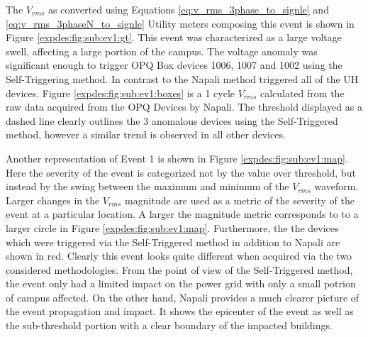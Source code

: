 The $V_{rms}$ as converted using Equations \ref{eq:v_rms_3phase_to_signle} and \ref{eq:v_rms_3phaseN_to_signle} Utility meters composing this event is shown in Figure \ref{expdes:fig:sub:ev1:gt}.
This event was characterized as a large voltage swell, affecting a large portion of the campus.
The voltage anomaly was significant enough to trigger OPQ Box devices 1006, 1007 and 1002 using the Self-Triggering method.
In contrast to the Napali method triggered all of the UH devices.
Figure \ref{expdes:fig:sub:ev1:boxes} is a 1 cycle $V_{rms}$ calculated from the raw data acquired from the OPQ Devices by Napali.
The threshold displayed as a dashed line clearly outlines the 3 anomalous devices using the Self-Triggered method, however a similar trend is observed in all other devices.

Another representation of Event 1 is shown in Figure \ref{expdes:fig:sub:ev1:map}.
Here the severity of the event is categorized not by the value over threshold, but instead by the swing between the maximum and minimum of the $V_{rms}$ waveform.
Larger changes in the $V_{rms}$ magnitude are used as a metric of the severity of the event at a particular location.
A larger the magnitude metric corresponds to to a larger circle in Figure \ref{expdes:fig:sub:ev1:map}.
Furthermore, the the devices which were triggered via the Self-Triggered method in addition to Napali are shown in red.
Clearly this event looks quite different when acquired via the two considered methodologies.
From the point of view of the Self-Triggered method, the event only had a limited impact on the power grid with only a small potrion of campus affected.
On the other hand, Napali provides a much clearer picture of the event propagation and impact.
It shows the epicenter of the event as well as the sub-threshold portion with a clear boundary of the impacted buildings.

